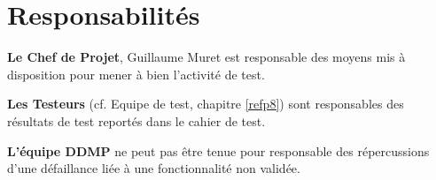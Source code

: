 
\chapter{Responsabilités}

\textbf{Le Chef de Projet}, Guillaume Muret est responsable des moyens mis à disposition pour mener à bien l'activité de test. 
 
\textbf{Les Testeurs} (cf. Equipe de test, chapitre \ref{refp8}) sont responsables des résultats de test reportés dans le cahier de test.
 
\textbf{L'équipe DDMP} ne peut pas être tenue pour responsable des répercussions d'une défaillance liée à une fonctionnalité non validée.
